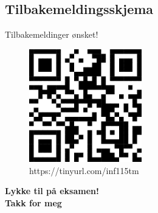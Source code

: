 








\subsection*{Tilbakemeldingsskjema}
\begin{frame}{Tilbakemeldinger ønsket!}
    \begin{figure}
        \centering
        \includegraphics[height = 4.9cm]{images/qrtilbakemelding.png}
        \caption{https://tinyurl.com/inf115tm}
        \label{fig:qrcodetilbakemelding}
    \end{figure}
\end{frame}

\begin{frame}
\begin{center}
\begin{Large}
\textbf{Lykke til på eksamen!\\[5mm]
Takk for meg}
\end{Large}
\end{center}  
\end{frame}
